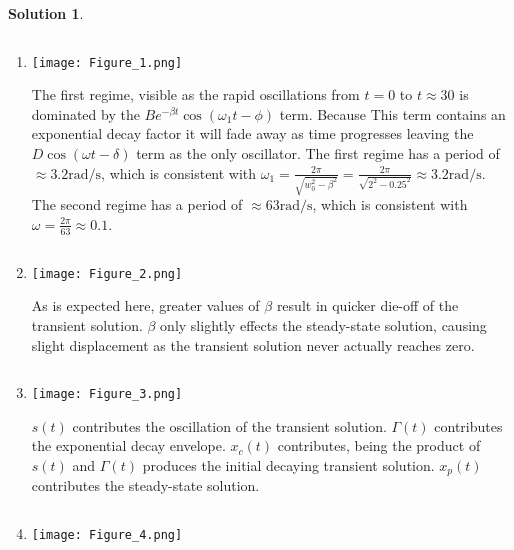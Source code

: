 \documentclass[10pt]{article}
\theoremstyle{definition}
\newtheorem{soln}{Solution}
\begin{document}
\begin{soln}
\begin{enumerate}[label=(\alph*)]
            \item \inputminted[breaklines, autogobble]{python3}{./python/q1/q1d.py}
                  \begin{center}
                        \texttt{[image: Figure\_1.png]}
                  \end{center}
                  The first regime, visible as the rapid oscillations from $t=0$ to $t\approx 30$ is dominated by the $Be^{-\beta t}\cos\left(\omega_1 t-\phi\right)$ term. Because
                  This term contains an exponential decay factor it will fade away as time progresses leaving the $D\cos\left(\omega t-\delta\right)$ term as the only oscillator.
                  The first regime has a period of $\approx 3.2\unit{\radian\per\second}$, which is consistent with $\omega_1=\frac{2\pi}{\sqrt{w_0^2-\beta^2}}=\frac{2\pi}{\sqrt{2^2-0.25^2}}\approx 3.2\unit{\radian\per\second}$.
                  The second regime has a period of $\approx 63\unit{\radian\per\second}$, which is consistent with $\omega=\frac{2\pi}{63}\approx0.1$.

            \item \inputminted[breaklines, autogobble]{python3}{./python/q1/q1e.py}
                  \begin{center}
                        \texttt{[image: Figure\_2.png]}
                  \end{center}
                  As is expected here, greater values of $\beta$ result in quicker die-off of the transient solution. $\beta$ only slightly effects
                  the steady-state solution, causing slight displacement as the transient solution never actually reaches zero.

            \item \inputminted[breaklines, autogobble]{python3}{./python/q1/q1f.py}
                  \begin{center}
                        \texttt{[image: Figure\_3.png]}
                  \end{center}
                  $s(t)$ contributes the oscillation of the transient solution. $\Gamma(t)$ contributes the exponential decay envelope. $x_c(t)$ contributes,
                  being the product of $s(t)$ and $\Gamma(t)$ produces the initial decaying transient solution. $x_p(t)$ contributes the steady-state solution.

            \item \inputminted[breaklines, autogobble]{python3}{./python/q1/q1g.py}
                  \begin{center}
                        \texttt{[image: Figure\_4.png]}
                  \end{center}
      \end{enumerate}
\end{soln}
\newpage
\end{document}
